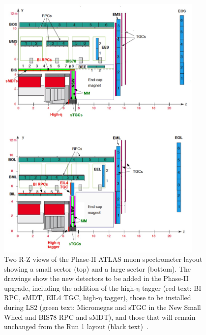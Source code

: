 \begin{figure}
	\centering
	\includegraphics[width=0.9\textwidth]{Chapters/CH3/figures/MS_rz_update}
	\caption{Two R-Z views of the Phase-II ATLAS muon spectrometer layout showing a small sector (top) and a large sector (bottom). The drawings show the new detectors to be added in the Phase-II upgrade, including the addition of the high-$\mathrm{\eta}$ tagger (red text: BI RPC, sMDT, EIL4 TGC, high-$\mathrm{\eta}$ tagger), those to be installed during LS2 (green text: Micromegas and sTGC in the New Small Wheel and BIS78 RPC and sMDT), and those that will remain unchanged from the Run 1 layout (black text)~\cite{TDR}.}
	\label{fig:MS_rz_update}
\end{figure}

